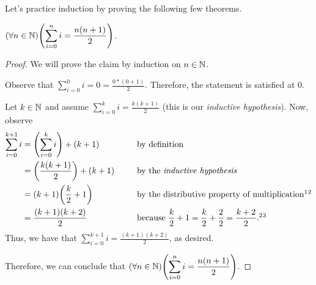 \newpage

Let's practice induction by proving the following few theorems.

\begin{theorem}\label{thm:gaussiansum}
    $\displaystyle \pn*{\forall n \in \N}\pn*{\sum_{i = 0}^{n}i = \frac{n(n + 1)}{2}}$.
\end{theorem}
\begin{proof}
    We will prove the claim by induction on $n \in \mathbb{N}$.
    \begin{case}
        Observe that $\displaystyle \sum_{i = 0}^{0}i = 0 = \frac{0*(0 + 1)}{2}$.
        Therefore, the statement is satisfied at $0$.
    \end{case}
    \begin{case}
        Let $k \in \mathbb{N}$ and assume $\displaystyle \sum_{i = 0}^{k}i = \frac{k(k + 1)}{2}$
        (this is our \emph{inductive hypothesis}).
        Now, observe
        \begin{alignat*}{2}
            \sum_{i = 0}^{k + 1}i &= \pn*{\sum_{i = 0}^{k}i} + (k + 1) &&\text{ by definition}\\
                                  &= \pn*{\frac{k(k + 1)}{2}} + (k + 1)~~~~&&\text{ by the \emph{inductive hypothesis}}\\
                                  &= (k + 1)\pn*{\frac{k}{2} + 1} &&\text{ by the distributive property of multiplication}\footnotemark[1]\footnotemark[2]\\
                                  &= \frac{(k + 1)(k + 2)}{2} &&\text{ because } \frac{k}{2} + 1 = \frac{k}{2} + \frac{2}{2} = \frac{k + 2}{2}.\footnotemark[2]\footnotemark[3]
        \end{alignat*}
        Thus, we have that $\displaystyle \sum_{i = 0}^{k + 1}i = \frac{(k + 1)(k + 2)}{2}$, as desired.
    \end{case}
    Therefore, we can conclude that $\displaystyle \pn*{\forall n \in \N}\pn*{\sum_{i = 0}^{n}i = \frac{n(n + 1)}{2}}$.
\end{proof}


